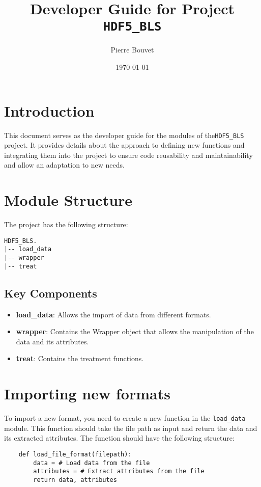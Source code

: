 \documentclass[a4paper,12pt]{article}
\title{Developer Guide for Project \texttt{HDF5\_BLS}}
\author{Pierre Bouvet}
\date{\today}
\begin{document}
\maketitle

\tableofcontents

\section{Introduction}
This document serves as the developer guide for the modules of the\texttt{HDF5\_BLS} project. It provides details about the approach to defining new functions and integrating them into the project to ensure code reusability and maintainability and allow an adaptation to new needs.

\section{Module Structure}
The project has the following structure:
\begin{verbatim}
HDF5_BLS.
|-- load_data
|-- wrapper
|-- treat
\end{verbatim}

\subsection{Key Components}
\begin{itemize}
    \item \textbf{load\_data}: Allows the import of data from different formats.
    \item \textbf{wrapper}: Contains the Wrapper object that allows the manipulation of the data and its attributes.
    \item \textbf{treat}: Contains the treatment functions.
\end{itemize}

\section{Importing new formats}
To import a new format, you need to create a new function in the \texttt{load\_data} module. This function should take the file path as input and return the data and its extracted attributes. The function should have the following structure:
\begin{verbatim}
    def load_file_format(filepath):
        data = # Load data from the file
        attributes = # Extract attributes from the file
        return data, attributes
\end{verbatim}
\end{document}
